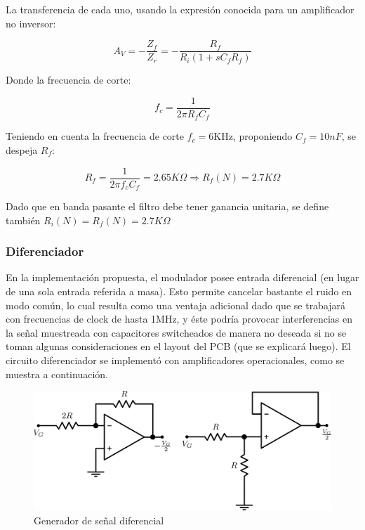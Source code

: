 \documentclass[assd_tp3_main.tex]{subfiles}
\begin{document}
La transferencia de cada uno, usando la expresión conocida para un amplificador no inversor:

\[
A_V = -\frac{Z_f}{Z_r} = -\frac{R_f}{R_i(1+sC_fR_f)}
\]

Donde la frecuencia de corte:

\[
f_c = \frac{1}{2 \pi R_f C_f}
\]

Teniendo en cuenta la frecuencia de corte $f_c = 6$KHz, proponiendo $C_f = 10nF$, se despeja $R_f$:

\[
R_f = \frac{1}{2 \pi f_c C_f} = 2.65K\Omega \Longrightarrow R_f(N) = 2.7K\Omega
\] 

Dado que en banda pasante el filtro debe tener ganancia unitaria, se define también $R_i(N) = R_f(N) = 2.7K\Omega$

\subsubsection{Diferenciador}

En la implementación propuesta, el modulador posee entrada diferencial (en lugar de una sola entrada referida a masa). Esto permite cancelar bastante el ruido en modo común, lo cual resulta como una ventaja adicional dado que se trabajará con frecuencias de clock de hasta 1MHz, y éste podría provocar interferencias en la señal muestreada con capacitores switcheados de manera no deseada si no se toman algunas consideraciones en el layout del PCB (que se explicará luego). El circuito diferenciador se implementó con amplificadores operacionales, como se muestra a continuación.

\begin{figure}[!ht]
\begin{centering}
\includegraphics[scale=0.45]{images/ej5/diferenciador.png}
\par\end{centering}
\caption{Generador de señal diferencial}
\end{figure}
\end{document}
